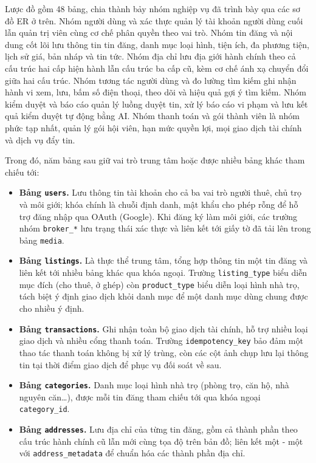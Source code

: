Lược đồ gồm 48 bảng, chia thành bảy nhóm nghiệp vụ đã trình bày qua các sơ đồ ER ở trên. Nhóm người dùng và xác thực quản lý tài khoản người dùng cuối lẫn quản trị viên cùng cơ chế phân quyền theo vai trò. Nhóm tin đăng và nội dung cốt lõi lưu thông tin tin đăng, danh mục loại hình, tiện ích, đa phương tiện, lịch sử giá, bản nháp và tin tức. Nhóm địa chỉ lưu địa giới hành chính theo cả cấu trúc hai cấp hiện hành lẫn cấu trúc ba cấp cũ, kèm cơ chế ánh xạ chuyển đổi giữa hai cấu trúc. Nhóm tương tác người dùng và đo lường tìm kiếm ghi nhận hành vi xem, lưu, bấm số điện thoại, theo dõi và hiệu quả gợi ý tìm kiếm. Nhóm kiểm duyệt và báo cáo quản lý luồng duyệt tin, xử lý báo cáo vi phạm và lưu kết quả kiểm duyệt tự động bằng AI. Nhóm thanh toán và gói thành viên là nhóm phức tạp nhất, quản lý gói hội viên, hạn mức quyền lợi, mọi giao dịch tài chính và dịch vụ đẩy tin.

Trong đó, năm bảng sau giữ vai trò trung tâm hoặc được nhiều bảng khác tham chiếu tới:

\begin{itemize}
\item \textbf{Bảng \texttt{users}.} Lưu thông tin tài khoản cho cả ba vai trò người thuê, chủ trọ và môi giới; khóa chính là chuỗi định danh, mật khẩu cho phép rỗng để hỗ trợ đăng nhập qua OAuth (Google). Khi đăng ký làm môi giới, các trường nhóm \texttt{broker\_*} lưu trạng thái xác thực và liên kết tới giấy tờ đã tải lên trong bảng \texttt{media}.
\item \textbf{Bảng \texttt{listings}.} Là thực thể trung tâm, tổng hợp thông tin một tin đăng và liên kết tới nhiều bảng khác qua khóa ngoại. Trường \texttt{listing\_type} biểu diễn mục đích (cho thuê, ở ghép) còn \texttt{product\_type} biểu diễn loại hình nhà trọ, tách biệt ý định giao dịch khỏi danh mục để một danh mục dùng chung được cho nhiều ý định.
\item \textbf{Bảng \texttt{transactions}.} Ghi nhận toàn bộ giao dịch tài chính, hỗ trợ nhiều loại giao dịch và nhiều cổng thanh toán. Trường \texttt{idempotency\_key} bảo đảm một thao tác thanh toán không bị xử lý trùng, còn các cột ảnh chụp lưu lại thông tin tại thời điểm giao dịch để phục vụ đối soát về sau.
\item \textbf{Bảng \texttt{categories}.} Danh mục loại hình nhà trọ (phòng trọ, căn hộ, nhà nguyên căn\ldots), được mỗi tin đăng tham chiếu tới qua khóa ngoại \texttt{category\_id}.
\item \textbf{Bảng \texttt{addresses}.} Lưu địa chỉ của từng tin đăng, gồm cả thành phần theo cấu trúc hành chính cũ lẫn mới cùng tọa độ trên bản đồ; liên kết một - một với \texttt{address\_metadata} để chuẩn hóa các thành phần địa chỉ.
\end{itemize}

